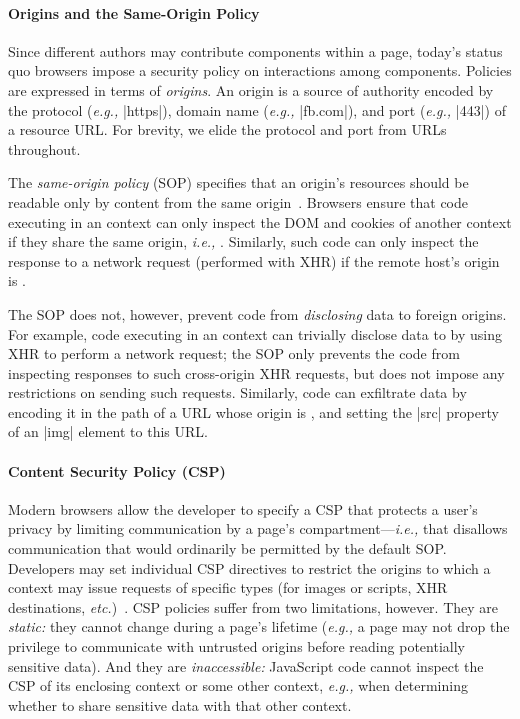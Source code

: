 \paragraph{Origins and the Same-Origin Policy}
Since different authors may contribute components within a page,
today's status quo browsers impose a security policy on interactions
among components. Policies are expressed in terms of \emph{origins}.
An origin is a source of authority encoded by the protocol (\emph{e.g.,}
\js|https|), domain name (\emph{e.g.,} \js|fb.com|), and port (\emph{e.g.,} \js|443|)
of a resource URL. For brevity, we elide the protocol and
port from URLs throughout.

The {\em same-origin policy} (SOP) specifies that an origin's
resources should be readable only by content from the same
origin~\cite{rfc6454, googlehandbook, VanKesteren2012}.  Browsers
ensure that code executing in an  context can only
inspect the DOM and cookies of another context if they share the same
origin, \emph{i.e.,} . Similarly, such code can only
inspect the response to a network request (performed with XHR) if the
remote host's origin is .
%
 
The SOP does not, however, prevent code from \emph{disclosing} data to
foreign origins. For example, code executing in an 
context can trivially disclose data to  by using XHR to
perform a network request; the SOP only prevents the code from
inspecting responses to such cross-origin XHR requests, but does not
impose any restrictions on sending such requests.
Similarly, code can exfiltrate data by encoding it in the path of a
URL whose origin is , and setting the \js|src| property
of an \js|img| element to this URL.

\paragraph{Content Security Policy (CSP)}

Modern browsers allow the developer to specify a CSP that
protects a user's privacy by limiting communication by a page's
compartment---\emph{i.e.,} that disallows communication that would
ordinarily be permitted by the default SOP\@. Developers may set
individual CSP directives to restrict the origins to which a context
may issue requests of specific types (for images or scripts, XHR
destinations, \emph{etc.})~\cite{csp}. CSP policies suffer from two
limitations, however. They are {\em static:} they cannot change during
a page's lifetime (\emph{e.g.,} a page may not drop the privilege to
communicate with untrusted origins before reading potentially
sensitive data). And they are {\em inaccessible:} JavaScript code
cannot inspect the CSP of its enclosing context or some other context,
\emph{e.g.,} when determining whether to share sensitive data with
that other context.

